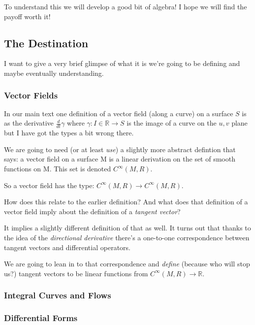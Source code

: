 \documentclass{article}
\begin{document}
To understand this we will develop a good bit of algebra! I hope we will find
the payoff worth it!

\subsection {The Destination}

I want to give a very brief glimpse of what it is we're going to be defining and
maybe eventually understanding.

\subsubsection {Vector Fields}

In our main text \cite{toponogov} one definition of a vector field (along a
curve) on a surface $S$ is as the derivative $\frac{d}{dt}\gamma$ where $\gamma : I \in
\mathbb{R} \to S$ is the image of a curve on the $u, v$ plane but I have got the
types a bit wrong there.

We are going to need (or at least \textsl{use}) a slightly more abstract
defintion that says: a vector field on a surface M is a linear derivation on the
set of smooth functions on M. This set is denoted $C^{\infty}(M, R)$.

So a vector field has the type: $C^{\infty}(M, R) \to C^{\infty}(M, R)$.

How does this relate to the earlier definition? And what does that definition of
a vector field imply about the definition of a \textsl{tangent vector}?

It implies a slightly different definition of that as well. It turns out that
thanks to the idea of the \textsl{directional derivative} there's a one-to-one
correspondence between tangent vectors and differential operators.

We are going to lean in to that correspondence and \textsl{define} (because who
will stop us?) tangent vectors to be linear functions from $C^{\infty}(M, R) \to
\mathbb{R}$.

\subsubsection {Integral Curves and Flows}

\subsubsection {Differential Forms}
\end{document}
